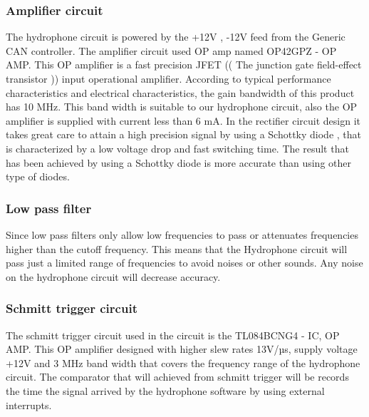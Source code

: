 \subsubsection{Amplifier circuit }
The hydrophone circuit is powered by the +12V , -12V feed from the Generic CAN controller. The amplifier circuit used OP amp named OP42GPZ - OP AMP. This OP amplifier is a fast precision JFET (( The junction gate field-effect transistor )) input operational amplifier.
According to typical performance characteristics and electrical characteristics, the gain bandwidth of this product has 10 MHz. This band width is suitable to our hydrophone circuit, also the OP amplifier is supplied with current less than 6 mA.
In the rectifier circuit design it takes great care to attain a high precision signal by using a Schottky diode , that is characterized by a low voltage drop and fast switching time.
The result that has been achieved by using a Schottky diode is more accurate than using other type of diodes.  

\subsubsection{Low pass filter}
Since low pass filters only allow low frequencies to pass or attenuates frequencies higher than the cutoff frequency.
This means that the Hydrophone circuit will pass just a limited range of frequencies to avoid noises or other sounds. Any noise on the hydrophone circuit will decrease accuracy.    
 
 \subsubsection{Schmitt trigger  circuit}
The schmitt trigger circuit used in the circuit is the TL084BCNG4 - IC, OP AMP. This OP amplifier designed with higher slew rates 13V/µs, supply voltage +12V and 3 MHz band width that covers the frequency range of the hydrophone circuit.
The comparator that will achieved from schmitt trigger will be records the time the signal arrived by the hydrophone software by using external interrupts.
 


